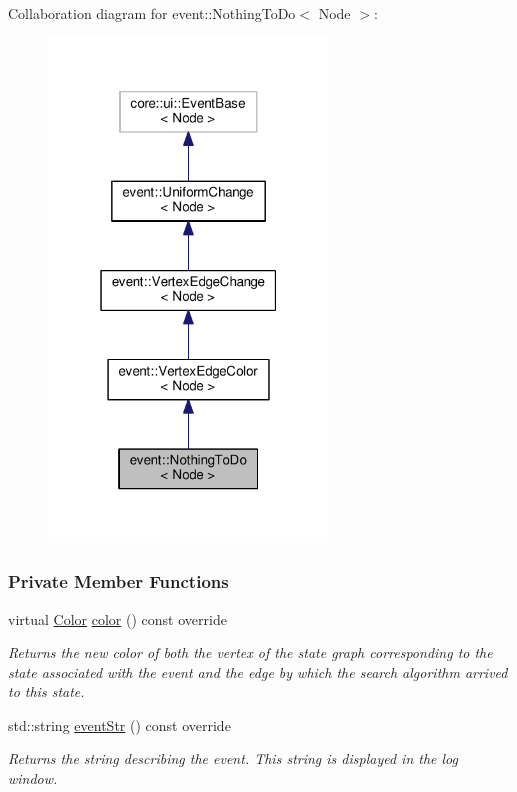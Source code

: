 Collaboration diagram for event\+:\+:Nothing\+To\+Do$<$ Node $>$\+:\nopagebreak
\begin{figure}[H]
\begin{center}
\leavevmode
\includegraphics[width=211pt]{structevent_1_1NothingToDo__coll__graph}
\end{center}
\end{figure}
\subsubsection*{Private Member Functions}
\begin{DoxyCompactItemize}
\item 
virtual \hyperlink{colors_8h_ab87bacfdad76e61b9412d7124be44c1c}{Color} \hyperlink{structevent_1_1NothingToDo_ab8f3ffc4b17738b584fa0c479cdc90ff}{color} () const override
\begin{DoxyCompactList}\small\item\em Returns the new color of both the vertex of the state graph corresponding to the state associated with the event and the edge by which the search algorithm arrived to this state. \end{DoxyCompactList}\item 
std\+::string \hyperlink{structevent_1_1NothingToDo_a18189481b8a4e5e2ebf8f742dbea47b6}{event\+Str} () const override
\begin{DoxyCompactList}\small\item\em Returns the string describing the event. This string is displayed in the log window. \end{DoxyCompactList}\end{DoxyCompactItemize}
